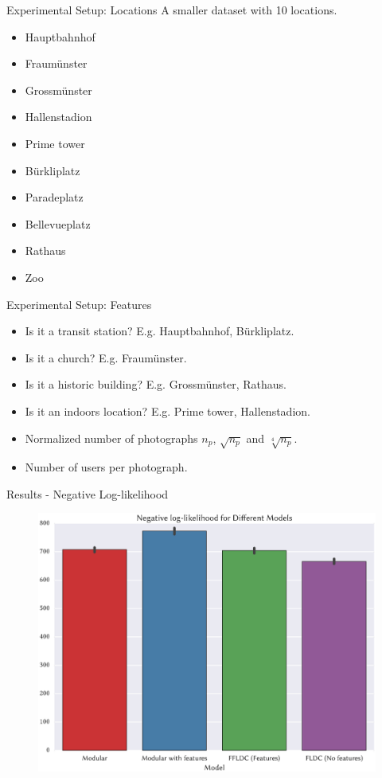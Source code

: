 \documentclass{beamer}
\begin{document}
\begin{frame}{Experimental Setup: Locations}
  A smaller dataset with 10 locations.
  \begin{itemize}
    \item Hauptbahnhof
    \item Fraumünster
    \item Grossmünster
    \item Hallenstadion
    \item Prime tower
    \item Bürkliplatz
    \item Paradeplatz
    \item Bellevueplatz
    \item Rathaus
    \item Zoo
  \end{itemize}
\end{frame}

\begin{frame}{Experimental Setup: Features}
  \begin{itemize}
    \item Is it a transit station? E.g. Hauptbahnhof, Bürkliplatz.
    \item Is it a church? E.g. Fraumünster.
    \item Is it a historic building? E.g. Grossmünster, Rathaus.
    \item Is it an indoors location? E.g. Prime tower, Hallenstadion.
    \item Normalized number of photographs $n_{p}$, $\sqrt{n_{p}}$ and $\sqrt[4]{n_{p}}$.
    \item Number of users per photograph.
  \end{itemize}
\end{frame}

\begin{frame}{Results - Negative Log-likelihood}
  \begin{figure}
    \centering
    \includegraphics[width=.8\textwidth]{ffldc_10_nlog}
  \end{figure}
\end{frame}
\end{document}
